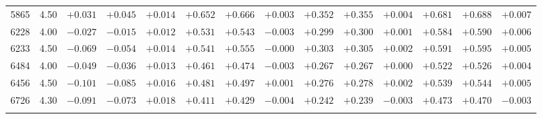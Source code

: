 \documentclass[]{aa}
\begin{document}
\begin{appendix}
\begin{table*}
\begin{center}
\begin{tabular}{llllllllllllll}
5865  &4.50 & $+0.031$ & $+0.045$ &$ +0.014$ &$ +0.652$ &$ +0.666$ &$ +0.003$ &$ +0.352$ &$ +0.355$ &$ +0.004$ &$ +0.681$&$ +0.688$&$  +0.007$ \\
6228  &4.00 & $-0.027$ & $-0.015$ &$ +0.012$ &$ +0.531$ &$ +0.543$ &$ -0.003$ &$ +0.299$ &$ +0.300$ &$ +0.001$ &$ +0.584$&$ +0.590$&$  +0.006$ \\
6233  &4.50 & $-0.069$ & $-0.054$ &$ +0.014$ &$ +0.541$ &$ +0.555$ &$ -0.000$ &$ +0.303$ &$ +0.305$ &$ +0.002$ &$ +0.591$&$ +0.595$&$  +0.005$ \\
6484  &4.00 & $-0.049$ & $-0.036$ &$ +0.013$ &$ +0.461$ &$ +0.474$ &$ -0.003$ &$ +0.267$ &$ +0.267$ &$ +0.000$ &$ +0.522$&$ +0.526$&$  +0.004$ \\
6456  &4.50 & $-0.101$ & $-0.085$ &$ +0.016$ &$ +0.481$ &$ +0.497$ &$ +0.001$ &$ +0.276$ &$ +0.278$ &$ +0.002$ &$ +0.539$&$ +0.544$&$  +0.005$ \\
6726  &4.30 & $-0.091$ & $-0.073$ &$ +0.018$ &$ +0.411$ &$ +0.429$ &$ -0.004$ &$ +0.242$ &$ +0.239$ &$ -0.003$ &$ +0.473$&$ +0.470$&$  -0.003$ \\
\hline\noalign{\smallskip}
\hline\noalign{\smallskip}
\end{tabular}
\end{center}
\end{table*}


\end{appendix}
\end{document}
